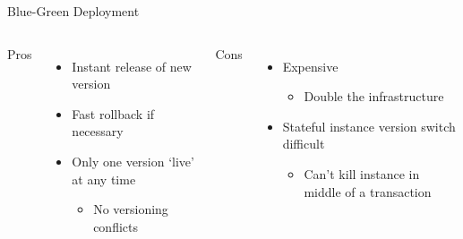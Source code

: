 \documentclass{slide}
\begin{document}
\begin{frame}{Blue-Green Deployment}
    \vspace{1pt}
    \begin{columns}[t]
      \huge Pros
      {\LARGE
        \begin{itemize}
            \item Instant release of new version
            \item Fast rollback if necessary
            \vspace{1mm}
            \item Only one version `live' at any time
            \begin{itemize}
                \Large\item No versioning conflicts
            \end{itemize}
        \end{itemize}
      }
      \huge Cons
      {\LARGE
        \begin{itemize}
            \item Expensive
            \begin{itemize}
                \Large\item Double the infrastructure
            \end{itemize}
            \vspace{2mm}
            \item Stateful instance version switch difficult
            \begin{itemize}
                \Large\item Can't kill instance in middle of a transaction
            \end{itemize}
        \end{itemize}
      }
    \end{columns}
\end{frame}
\end{document}
